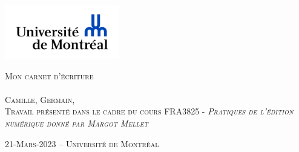 \documentclass[12pt,french,letterpaper]{article}
\author{Camille    Germain    Université de Montréal }
\date{}
\begin{document}

\begin{titlepage}%
\begin{center}
    \enlargethispage{2cm}
    
\includegraphics[width = 50mm]{logo} %

\vspace*{3cm}
\scshape\Huge Mon carnet d'écriture\\
\normalfont\Large \\
\large \vspace*{3cm}
Camille,  Germain,  
\\
\normalsize\vspace*{1cm}Travail présenté dans le cadre du cours FRA3825 - \em Pratiques
de l'édition numérique
 \normalfont donné par Margot Mellet 

\vspace*{3cm}
\end{center}

\vspace*{\fill}
\begin{flushright}
\end{flushright}

\begin{center}
\scshape\normalsize\vspace*{1cm} 21-Mars-2023 --      Université de
Montréal 
\\
\end{center}
\end{titlepage}




\newpage 
\end{document}
